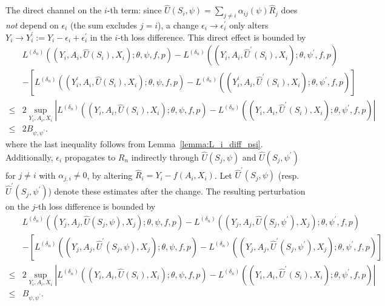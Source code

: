 \documentclass[12pt]{article}
\begin{document}
The direct channel on the $i$-th term: since $\widehat{U}(S_i,\psi)=\sum_{j\neq i}\alpha_{ij}(\psi)\widehat{R}_j$ does \emph{not} depend on $\epsilon_i$ (the sum excludes $j=i$), a change $\epsilon_i\to\epsilon_i^\prime$ only alters $Y_i\to Y_i^\prime:=Y_i-\epsilon_i+\epsilon_i^\prime$ in the $i$-th loss difference. This direct effect is bounded by
\begin{align*}
    &L^{(\delta_n)}((Y_i,A_i,\widehat U(S_i),X_i);\theta,\psi,f,p) - L^{(\delta_n)}((Y_i,A_i,\widehat U^\prime(S_i),X_i);\theta,\psi^\prime,f,p) \\
    & - \left[L^{(\delta_n)}((Y_i^\prime,A_i,\widehat U(S_i),X_i);\theta,\psi,f,p) - L^{(\delta_n)}((Y_i^\prime,A_i,\widehat U^\prime(S_i),X_i);\theta,\psi^\prime,f,p)\right]\\
    \leq & 2 \sup_{Y_i,A_i,X_i}\left|L^{(\delta_n)}((Y_i,A_i,\widehat U(S_i),X_i);\theta,\psi,f,p) - L^{(\delta_n)}((Y_i,A_i,\widehat U^\prime(S_i),X_i);\theta,\psi^\prime,f,p)\right|\\
    \leq & 2B_{\psi,\psi^\prime}.
\end{align*}
where the last inequality follows from Lemma~\ref{lemma:L_i_diff_psi}. Additionally, $\epsilon_i$ propagates to $R_n$ indirectly through $\widehat{U}(S_j,\psi)$ and $\widehat{U}(S_j,\psi^\prime)$ for $j\neq i$ with $\alpha_{j,i}\neq 0$, by altering $\widehat{R}_i = Y_i - f(A_i,X_i)$. Let $\widehat{U}^\prime(S_j,\psi)$ (resp.\ $\widehat{U}^\prime(S_j,\psi^\prime)$) denote these estimates after the change. The resulting perturbation on the $j$-th loss difference is bounded by
\begin{align*}
    &L^{(\delta_n)}((Y_j,A_j,\widehat U(S_j,\psi),X_j);\theta,\psi,f,p) - L^{(\delta_n)}((Y_j,A_j,\widehat U(S_j,\psi^\prime),X_j);\theta,\psi^\prime,f,p) \\
    & - \left[L^{(\delta_n)}((Y_j,A_j,\widehat U^\prime(S_j,\psi),X_j);\theta,\psi,f,p) - L^{(\delta_n)}((Y_j,A_j,\widehat U^\prime(S_j,\psi^\prime),X_j);\theta,\psi^\prime,f,p)\right]\\
    \leq & 2 \sup_{Y_i,A_i,X_i}\left|L^{(\delta_n)}((Y_i,A_i,\widehat U(S_i),X_i);\theta,\psi,f,p) - L^{(\delta_n)}((Y_i,A_i,\widehat U^\prime(S_i),X_i);\theta,\psi^\prime,f,p)\right|\\
    \leq & B_{\psi,\psi^\prime}.
\end{align*}
\end{document}
